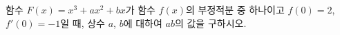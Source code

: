 함수 $F(x)=x^3+ax^2+bx$가 함수 $f(x)$의 부정적분 중 하나이고 $f(0)=2$, $f'(0)=-1$일 때, 상수 $a$, $b$에 대하여 $ab$의 값을 구하시오.
